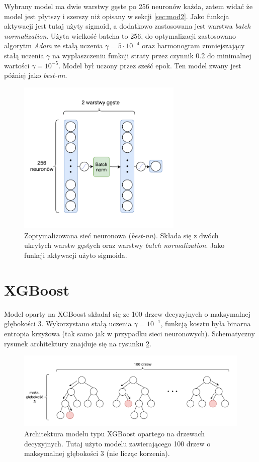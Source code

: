\documentclass{pracalicmgr}
\begin{document}
	Wybrany model ma dwie warstwy gęste po 256 neuronów każda, zatem widać że model jest płytszy i szerszy niż opisany w sekcji \ref{sec:mod2}. Jako funkcja aktywacji jest tutaj użyty sigmoid, a dodatkowo zastosowana jest warstwa \textit{batch normalization}. Użyta wielkość batcha to 256, do optymalizacji  zastosowano algorytm \textit{Adam} ze stałą uczenia $\gamma = 5\cdot 10^{-4}$ oraz harmonogram zmniejszający stałą uczenia $\gamma$ na wypłaszczeniu funkcji straty przez czynnik 0.2 do minimalnej wartości $\gamma = 10^{-5}$. Model był uczony przez sześć epok. Ten model zwany jest później jako \textit{best-nn}.
	\begin{figure}
	\centering
	\includegraphics[width=0.7\textwidth]{best_neural_net.pdf}
	\caption{Zoptymalizowana sieć neuronowa (\textit{best-nn}). Składa się z dwóch ukrytych warstw gęstych oraz warstwy \textit{batch normalization}. Jako funkcji aktywacji użyto sigmoida.}
	\label{fig:nn2}
	\end{figure}	
	
	\section{XGBoost}
	Model oparty na XGBoost składał się ze 100 drzew decyzyjnych o maksymalnej głębokości 3. Wykorzystano stałą uczenia $\gamma = 10^{-1}$, funkcją kosztu była binarna entropia krzyżowa (tak samo jak w przypadku sieci neuronowych). Schematyczny rysunek architektury znajduje się na rysunku \ref{fig:xgb}.
	\begin{figure}
	\centering
	\includegraphics[width=1.0\textwidth]{xgb.pdf}
	\caption{Architektura modelu typu XGBoost opartego na drzewach decyzyjnych. Tutaj użyto modelu zawierającego 100 drzew o maksymalnej głębokości 3 (nie licząc korzenia).}
	\label{fig:xgb}
	\end{figure}
    
\end{document}

